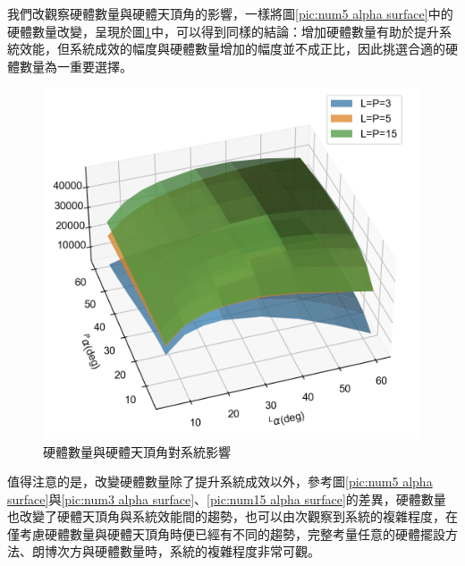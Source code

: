 我們改觀察硬體數量與硬體天頂角的影響，一樣將圖\ref{pic:num5 alpha surface}中的硬體數量改變，呈現於圖\ref{pic:alpha_effect}中，可以得到同樣的結論：增加硬體數量有助於提升系統效能，但系統成效的幅度與硬體數量增加的幅度並不成正比，因此挑選合適的硬體數量為一重要選擇。

\begin{figure}[htpb]
    \centering
    \includegraphics[width=15cm]{ch4pic/alpha_effect.png}
    \caption{硬體數量與硬體天頂角對系統影響}
    \label{pic:alpha_effect}
\end{figure}

值得注意的是，改變硬體數量除了提升系統成效以外，參考圖\ref{pic:num5 alpha surface}與\ref{pic:num3 alpha surface}、\ref{pic:num15 alpha surface}的差異，硬體數量也改變了硬體天頂角與系統效能間的趨勢，也可以由次觀察到系統的複雜程度，在僅考慮硬體數量與硬體天頂角時便已經有不同的趨勢，完整考量任意的硬體擺設方法、朗博次方與硬體數量時，系統的複雜程度非常可觀。

